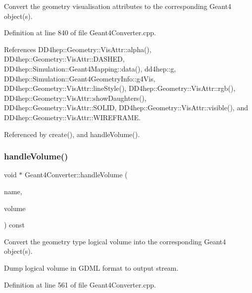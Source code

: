 Convert the geometry visualisation attributes to the corresponding Geant4 object(s). 



Definition at line 840 of file Geant4\+Converter.\+cpp.



References D\+D4hep\+::\+Geometry\+::\+Vis\+Attr\+::alpha(), D\+D4hep\+::\+Geometry\+::\+Vis\+Attr\+::\+D\+A\+S\+H\+ED, D\+D4hep\+::\+Simulation\+::\+Geant4\+Mapping\+::data(), dd4hep\+::g, D\+D4hep\+::\+Simulation\+::\+Geant4\+Geometry\+Info\+::g4\+Vis, D\+D4hep\+::\+Geometry\+::\+Vis\+Attr\+::line\+Style(), D\+D4hep\+::\+Geometry\+::\+Vis\+Attr\+::rgb(), D\+D4hep\+::\+Geometry\+::\+Vis\+Attr\+::show\+Daughters(), D\+D4hep\+::\+Geometry\+::\+Vis\+Attr\+::\+S\+O\+L\+ID, D\+D4hep\+::\+Geometry\+::\+Vis\+Attr\+::visible(), and D\+D4hep\+::\+Geometry\+::\+Vis\+Attr\+::\+W\+I\+R\+E\+F\+R\+A\+ME.



Referenced by create(), and handle\+Volume().

\hypertarget{class_d_d4hep_1_1_simulation_1_1_geant4_converter_abbdbb39ba21904e083ef924c1129884f}{}\label{class_d_d4hep_1_1_simulation_1_1_geant4_converter_abbdbb39ba21904e083ef924c1129884f} 
\subsubsection{\texorpdfstring{handle\+Volume()}{handleVolume()}}
{\footnotesize\ttfamily void $\ast$ Geant4\+Converter\+::handle\+Volume (\begin{DoxyParamCaption}\item[{const std\+::string \&}]{name,  }\item[{const T\+Geo\+Volume $\ast$}]{volume }\end{DoxyParamCaption}) const\hspace{0.3cm}{\ttfamily [virtual]}}



Convert the geometry type logical volume into the corresponding Geant4 object(s). 

Dump logical volume in G\+D\+ML format to output stream. 

Definition at line 561 of file Geant4\+Converter.\+cpp.



